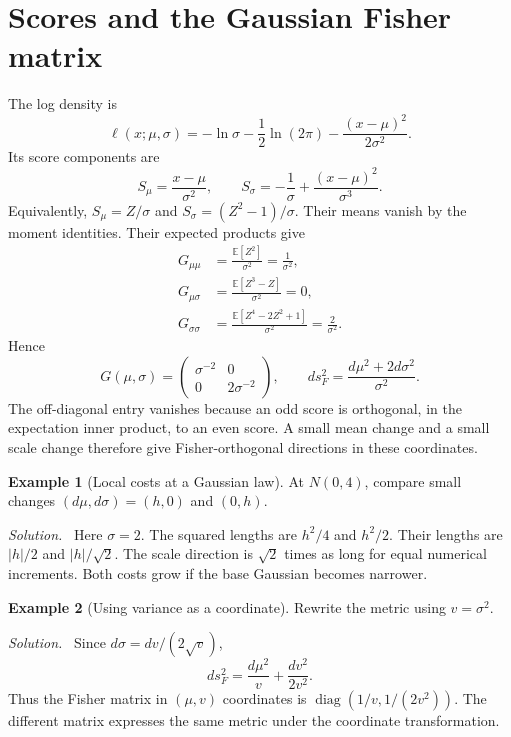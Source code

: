 \documentclass[11pt,oneside,openany]{book}
\theoremstyle{definition}
\newtheorem{example}{Example}[chapter]
\theoremstyle{remark}
\newenvironment{solution}{\par\smallskip\noindent\textit{Solution.}\ }{\par\smallskip}
\newcommand{\E}{\mathbb{E}}
\newcommand{\diag}{\operatorname{diag}}
\numberwithin{equation}{chapter}
\begin{document}
\section{Scores and the Gaussian Fisher matrix}
The log density is
\[
\ell(x;\mu,\sigma)=-\ln\sigma-\frac12\ln(2\pi)
-\frac{(x-\mu)^2}{2\sigma^2}.
\]
Its score components are
\begin{equation}\label{eq:gaussianscores}
S_\mu=\frac{x-\mu}{\sigma^2},\qquad
S_\sigma=-\frac1\sigma+\frac{(x-\mu)^2}{\sigma^3}.
\end{equation}
Equivalently, $S_\mu=Z/\sigma$ and $S_\sigma=(Z^2-1)/\sigma$. Their means vanish by the moment identities. Their expected products give
\begin{align*}
G_{\mu\mu}&=\frac{\E[Z^2]}{\sigma^2}=\frac1{\sigma^2},\\
G_{\mu\sigma}&=\frac{\E[Z^3-Z]}{\sigma^2}=0,\\
G_{\sigma\sigma}&=\frac{\E[Z^4-2Z^2+1]}{\sigma^2}=\frac2{\sigma^2}.
\end{align*}
Hence
\begin{equation}\label{eq:gaussianmatrix}
\boxed{G(\mu,\sigma)=\begin{pmatrix}\sigma^{-2}&0\\0&2\sigma^{-2}\end{pmatrix},
\qquad ds_F^2=\frac{d\mu^2+2d\sigma^2}{\sigma^2}.}
\end{equation}
The off-diagonal entry vanishes because an odd score is orthogonal, in the expectation inner product, to an even score. A small mean change and a small scale change therefore give Fisher-orthogonal directions in these coordinates.

\begin{example}[Local costs at a Gaussian law]
At $N(0,4)$, compare small changes $(d\mu,d\sigma)=(h,0)$ and $(0,h)$.
\begin{solution}
Here $\sigma=2$. The squared lengths are $h^2/4$ and $h^2/2$. Their lengths are $|h|/2$ and $|h|/\sqrt2$. The scale direction is $\sqrt2$ times as long for equal numerical increments. Both costs grow if the base Gaussian becomes narrower.
\end{solution}
\end{example}

\begin{example}[Using variance as a coordinate]
Rewrite the metric using $v=\sigma^2$.
\begin{solution}
Since $d\sigma=dv/(2\sqrt v)$,
\[
ds_F^2=\frac{d\mu^2}{v}+\frac{dv^2}{2v^2}.
\]
Thus the Fisher matrix in $(\mu,v)$ coordinates is $\diag(1/v,1/(2v^2))$. The different matrix expresses the same metric under the coordinate transformation.
\end{solution}
\end{example}
\end{document}
